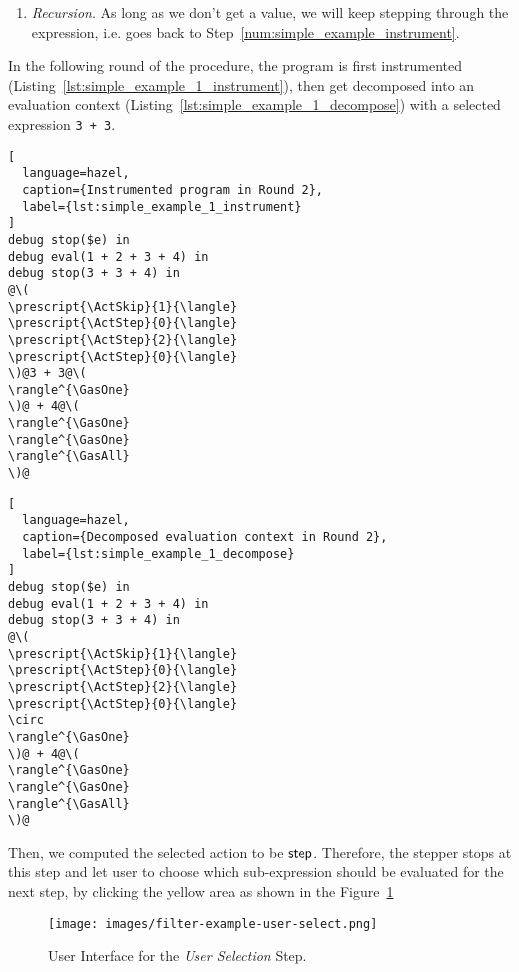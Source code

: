 \begin{enumerate}
\item \emph{Recursion}. As long as we don't get a value, we will keep
  stepping through the expression, i.e. goes back to
  Step~\ref{num:simple_example_instrument}.
\end{enumerate}

In the following round of the procedure, the program is first
instrumented (Listing~\ref{lst:simple_example_1_instrument}), then get
decomposed into an evaluation context
(Listing~\ref{lst:simple_example_1_decompose}) with a selected
expression \lstinline[language=hazel]{3 + 3}.

\begin{lstlisting}[
  language=hazel,
  caption={Instrumented program in Round 2},
  label={lst:simple_example_1_instrument}
]
debug stop($e) in
debug eval(1 + 2 + 3 + 4) in
debug stop(3 + 3 + 4) in
@\(
\prescript{\ActSkip}{1}{\langle}
\prescript{\ActStep}{0}{\langle}
\prescript{\ActStep}{2}{\langle}
\prescript{\ActStep}{0}{\langle}
\)@3 + 3@\(
\rangle^{\GasOne}
\)@ + 4@\(
\rangle^{\GasOne}
\rangle^{\GasOne}
\rangle^{\GasAll}
\)@\end{lstlisting}

\begin{lstlisting}[
  language=hazel,
  caption={Decomposed evaluation context in Round 2},
  label={lst:simple_example_1_decompose}
]
debug stop($e) in
debug eval(1 + 2 + 3 + 4) in
debug stop(3 + 3 + 4) in
@\(
\prescript{\ActSkip}{1}{\langle}
\prescript{\ActStep}{0}{\langle}
\prescript{\ActStep}{2}{\langle}
\prescript{\ActStep}{0}{\langle}
\circ
\rangle^{\GasOne}
\)@ + 4@\(
\rangle^{\GasOne}
\rangle^{\GasOne}
\rangle^{\GasAll}
\)@\end{lstlisting}

Then, we computed the selected action to be \(\mathsf{step}\). Therefore,
the stepper stops at this step and let user to choose which
sub-expression should be evaluated for the next step, by clicking the
yellow area as shown in the Figure~\ref{fig:simple_example_final_ui}

\begin{figure}[h]
  \centering
  \texttt{[image: images/filter-example-user-select.png]}
  \caption{User Interface for the \emph{User Selection} Step.}\label{fig:simple_example_final_ui}
\end{figure}


